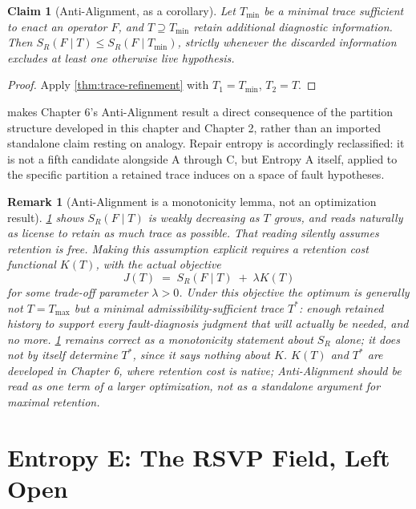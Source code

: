 \documentclass[12pt]{report}
\newtheorem{claim}[definition]{Claim}
\newtheorem{remark}[definition]{Remark}
\newcommand{\SR}{\ensuremath{S_R}}
\begin{document}
\begin{claim}[Anti-Alignment, as a corollary]
\label{cor:anti-alignment}
Let $T_{\min}$ be a minimal trace sufficient to enact an operator $F$,
and $T \supseteq T_{\min}$ retain additional diagnostic information.
Then $\SR(F\mid T) \leq \SR(F\mid T_{\min})$, strictly whenever the
discarded information excludes at least one otherwise live hypothesis.
\end{claim}

\begin{proof}
Apply \cref{thm:trace-refinement} with $T_1 = T_{\min}$, $T_2 = T$.
\end{proof}

 makes Chapter 6's Anti-Alignment result a
direct consequence of the partition structure developed in this chapter
and Chapter 2, rather than an imported standalone claim resting on
analogy. Repair entropy is accordingly reclassified: it is not a fifth
candidate alongside A through C, but Entropy A itself, applied to the
specific partition a retained trace induces on a space of fault
hypotheses.

\begin{remark}[Anti-Alignment is a monotonicity lemma, not an optimization result]
\label{rem:anti-alignment-scope}
\cref{cor:anti-alignment} shows $\SR(F \mid T)$ is weakly decreasing as
$T$ grows, and reads naturally as license to retain as much trace as
possible. That reading silently assumes retention is free. Making this
assumption explicit requires a retention cost functional $K(T)$, with
the actual objective
\[
J(T) \;=\; \SR(F \mid T) \;+\; \lambda K(T)
\]
for some trade-off parameter $\lambda > 0$. Under this objective the
optimum is generally not $T = T_{\max}$ but a minimal
\emph{admissibility-sufficient} trace $T^*$: enough retained history to
support every fault-diagnosis judgment that will actually be needed,
and no more. \cref{cor:anti-alignment} remains correct as a
monotonicity statement about $\SR$ alone; it does not by itself
determine $T^*$, since it says nothing about $K$. $K(T)$ and $T^*$ are
developed in Chapter 6, where retention cost is native; Anti-Alignment
should be read as one term of a larger optimization, not as a
standalone argument for maximal retention.
\end{remark}

\section{Entropy E: The RSVP Field, Left Open}
\label{sec:rsvp-entropy}
\end{document}
